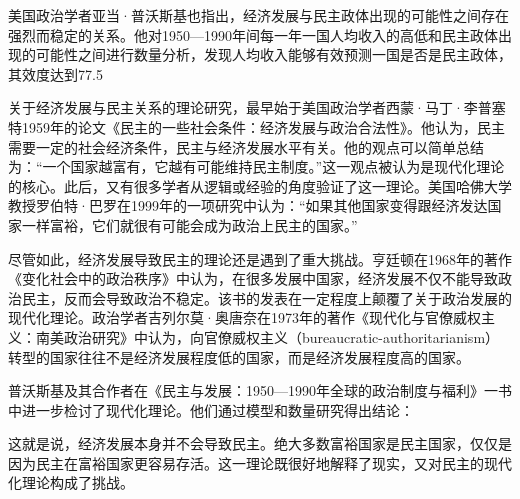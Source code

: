 美国政治学者亚当·普沃斯基也指出，经济发展与民主政体出现的可能性之间存在强烈而稳定的关系。他对1950—1990年间每一年一国人均收入的高低和民主政体出现的可能性之间进行数量分析，发现人均收入能够有效预测一国是否是民主政体，其效度达到77.5%

关于经济发展与民主关系的理论研究，最早始于美国政治学者西蒙·马丁·李普塞特1959年的论文《民主的一些社会条件：经济发展与政治合法性》。他认为，民主需要一定的社会经济条件，民主与经济发展水平有关。他的观点可以简单总结为：“一个国家越富有，它越有可能维持民主制度。”这一观点被认为是现代化理论的核心。此后，又有很多学者从逻辑或经验的角度验证了这一理论。美国哈佛大学教授罗伯特·巴罗在1999年的一项研究中认为：“如果其他国家变得跟经济发达国家一样富裕，它们就很有可能会成为政治上民主的国家。”

尽管如此，经济发展导致民主的理论还是遇到了重大挑战。亨廷顿在1968年的著作《变化社会中的政治秩序》中认为，在很多发展中国家，经济发展不仅不能导致政治民主，反而会导致政治不稳定。该书的发表在一定程度上颠覆了关于政治发展的现代化理论。政治学者吉列尔莫·奥唐奈在1973年的著作《现代化与官僚威权主义：南美政治研究》中认为，向官僚威权主义（bureaucratic-authoritarianism）转型的国家往往不是经济发展程度低的国家，而是经济发展程度高的国家。

普沃斯基及其合作者在《民主与发展：1950—1990年全球的政治制度与福利》一书中进一步检讨了现代化理论。他们通过模型和数量研究得出结论：


这就是说，经济发展本身并不会导致民主。绝大多数富裕国家是民主国家，仅仅是因为民主在富裕国家更容易存活。这一理论既很好地解释了现实，又对民主的现代化理论构成了挑战。

